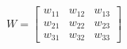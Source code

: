 \documentclass[preview]{standalone}
\begin{document}
\begin{align*}
W = \begin{bmatrix} w_{11} & w_{12} & w_{13} \\ w_{21} & w_{22} & w_{23} \\ w_{31} & w_{32} & w_{33} \end{bmatrix}
\end{align*}
\end{document}
